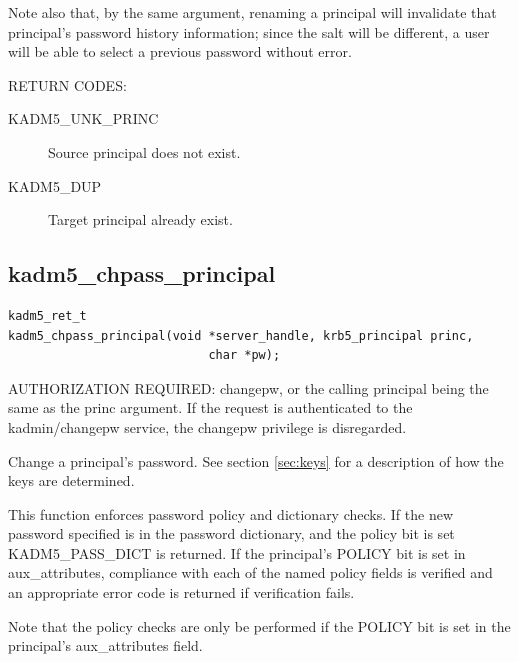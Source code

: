 Note also that, by the same argument, renaming a principal will
invalidate that principal's password history information; since the
salt will be different, a user will be able to select a previous
password without error.

RETURN CODES:

\begin{description}
\item[KADM5_UNK_PRINC] Source principal does not exist.
\item[KADM5_DUP] Target principal already exist.
\end{description}

\subsection{kadm5_chpass_principal}

\begin{verbatim}
kadm5_ret_t
kadm5_chpass_principal(void *server_handle, krb5_principal princ,
                            char *pw);
\end{verbatim}

AUTHORIZATION REQUIRED: changepw, or the calling principal being the
same as the princ argument.  If the request is authenticated to the
kadmin/changepw service, the changepw privilege is disregarded.

Change a principal's password.   See section \ref{sec:keys} for a
description of how the keys are determined.

This function enforces password policy and dictionary checks.  If the new
password specified is in the password dictionary, and the policy bit is set
KADM5_PASS_DICT is returned.  If the principal's POLICY bit is set in
aux_attributes, compliance with each of the named policy fields is verified
and an appropriate error code is returned if verification fails.

Note that the policy checks are only be performed if the POLICY bit is
set in the principal's aux_attributes field.

